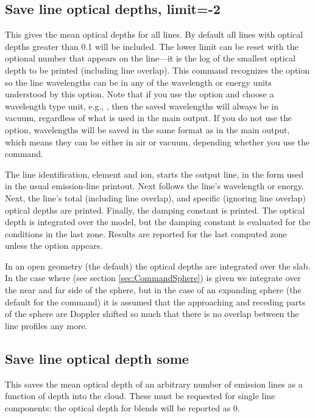 \subsection{Save line optical depths, limit=-2}

This gives the mean optical depths for all lines.  By default all lines
with optical depths greater than 0.1 will be included.  The lower limit
can be reset with the optional number that appears on the line---it is the
log of the smallest optical depth to be printed (including line overlap).
This command recognizes the  option so the line
wavelengths can be in any of the wavelength or energy units
understood by this option. Note that if you use the  option
and choose a wavelength type unit, e.g., , then the saved
wavelengths will always be in vacuum, regardless of what is used in the main
output. If you do not use the  option, wavelengths will be
saved in the same format as in the main output, which means they can be either
in air or vacuum, depending whether you use the 
command.

The line identification, element and ion, starts the output line, in
the form used in the usual emission-line printout.
Next follows the line's wavelength or energy.
Next, the line's total (including line overlap), and
specific (ignoring line overlap) optical depths are printed.
Finally, the damping constant is printed.
The optical depth is integrated over the model,
but the damping constant is evaluated for the
conditions in the last zone.
Results are reported for the last computed zone unless the  option
appears.

In an open geometry (the default) the optical depths are integrated over the slab.
In the case where  
(see section \ref{sec:CommandSphere}) is given we integrate over 
the near and far side
of the sphere, but in the case of an expanding sphere 
(the default for the  command) it is assumed that the 
approaching and receding parts of the sphere are Doppler shifted so much 
that there is no overlap between the line profiles any more.


\subsection{Save line optical depth some}

This saves the mean optical depth of an arbitrary number of emission lines as a
function of depth into the cloud.  These must be requested for single
line components: the optical depth for blends will be reported as 0.

